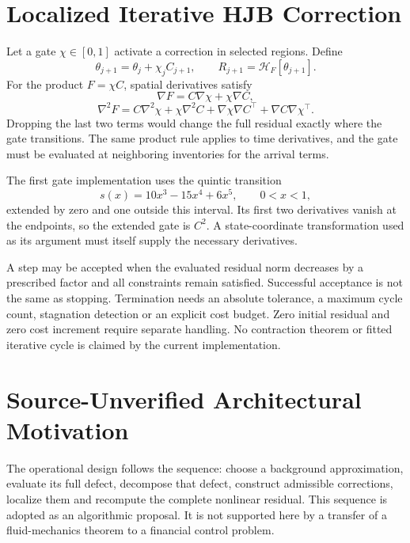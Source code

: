 \section{Localized Iterative HJB Correction}


Let a gate $\chi\in[0,1]$ activate a correction in selected regions. Define
\[
 \theta_{j+1}=\theta_j+\chi_j C_{j+1},\qquad
 R_{j+1}=\mathcal H_F[\theta_{j+1}].
\]
For the product $F=\chi C$, spatial derivatives satisfy
\[
 \nabla F=C\nabla\chi+\chi\nabla C,
\]
\[
 \nabla^2F=C\nabla^2\chi+\chi\nabla^2C
 +\nabla\chi\nabla C^\top+\nabla C\nabla\chi^\top.
\]
Dropping the last two terms would change the full residual exactly where the gate transitions. The same product rule applies to time derivatives, and the gate must be evaluated at neighboring inventories for the arrival terms.

The first gate implementation uses the quintic transition
\[
 s(x)=10x^3-15x^4+6x^5,\qquad 0<x<1,
\]
extended by zero and one outside this interval. Its first two derivatives vanish at the endpoints, so the extended gate is $C^2$. A state-coordinate transformation used as its argument must itself supply the necessary derivatives.

A step may be accepted when the evaluated residual norm decreases by a prescribed factor and all constraints remain satisfied. Successful acceptance is not the same as stopping. Termination needs an absolute tolerance, a maximum cycle count, stagnation detection or an explicit cost budget. Zero initial residual and zero cost increment require separate handling. No contraction theorem or fitted iterative cycle is claimed by the current implementation.
\section{Source-Unverified Architectural Motivation}


The operational design follows the sequence: choose a background approximation, evaluate its full defect, decompose that defect, construct admissible corrections, localize them and recompute the complete nonlinear residual. This sequence is adopted as an algorithmic proposal. It is not supported here by a transfer of a fluid-mechanics theorem to a financial control problem.

